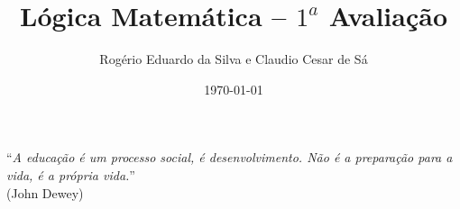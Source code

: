 \documentclass[12pt]{article}
\title{Lógica Matemática -- $1^a$ Avaliação}
\author{Rogério Eduardo da Silva e Claudio Cesar de Sá}
\date{\today}
\begin{document}
\pagestyle{empty}
\maketitle

%


\begin{flushright}
``\textit{A educação é um processo social, é desenvolvimento. Não é a preparação para a vida, é a própria vida.}''\\ (John Dewey)
\end{flushright}
\end{document}
